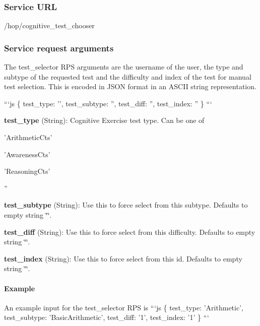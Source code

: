 \subsubsection*{Service U\-R\-L}

{\ttfamily /hop/cognitive\-\_\-test\-\_\-chooser}

\subsubsection*{Service request arguments}

The test\-\_\-selector R\-P\-S arguments are the username of the user, the type and subtype of the requested test and the difficulty and index of the test for manual test selection. This is encoded in J\-S\-O\-N format in an A\-S\-C\-I\-I string representation.

```js \{ test\-\_\-type\-: '', test\-\_\-subtype\-: '', test\-\_\-diff\-: '', test\-\_\-index\-: '' \} ```


\begin{DoxyItemize}
\item {\bfseries test\-\_\-type} (String)\-: Cognitive Exercise test type. Can be one of
\begin{DoxyItemize}
\item 'Arithmetic\-Cts'
\item 'Awareness\-Cts'
\item 'Reasoning\-Cts'
\item ''
\end{DoxyItemize}
\item {\bfseries test\-\_\-subtype} (String)\-: Use this to force select from this subtype. Defaults to empty string \char`\"{}\char`\"{}.
\item {\bfseries test\-\_\-diff} (String)\-: Use this to force select from this difficulty. Defaults to empty string \char`\"{}\char`\"{}.
\item {\bfseries test\-\_\-index} (String)\-: Use this to force select from this id. Defaults to empty string \char`\"{}\char`\"{}.
\end{DoxyItemize}

\paragraph*{Example}

An example input for the test\-\_\-selector R\-P\-S is ```js \{ test\-\_\-type\-: 'Arithmetic', test\-\_\-subtype\-: 'Basic\-Arithmetic', test\-\_\-diff\-: '1', test\-\_\-index\-: '1' \} ```

